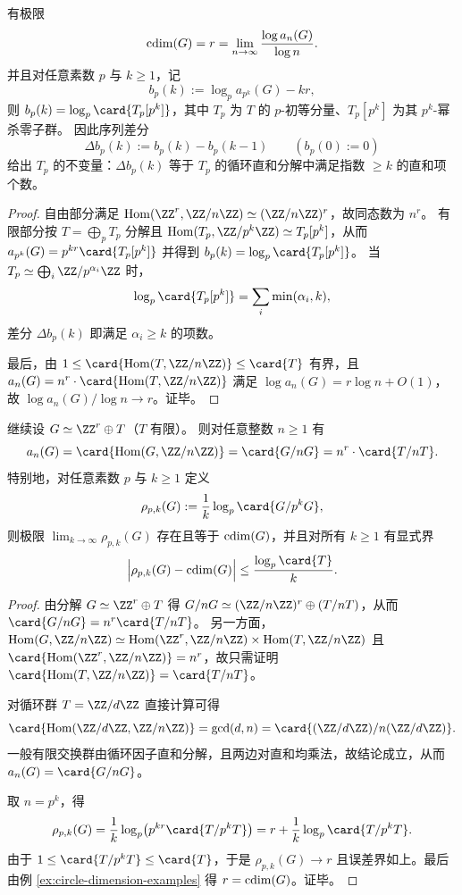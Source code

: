 \begin{theorem}\label{thm:cdim-finite-probe-extraction}
有极限
\[
\operatorname{cdim}(G)=r=\lim_{n\to\infty}\frac{\log a_n(G)}{\log n}.
\]
并且对任意素数 \(p\) 与 \(k\ge 1\)，记
\[
b_{p}(k):=\log_p a_{p^k}(G)-kr,
\]
则 \(b_p(k)=\log_p\card{T_p[p^k]}\)，其中 \(T_p\) 为 \(T\) 的 \(p\)-初等分量、\(T_p[p^k]\) 为其 \(p^k\)-幂杀零子群。
因此序列差分
\[
\Delta b_p(k):=b_p(k)-b_p(k-1)\qquad(b_p(0):=0)
\]
给出 \(T_p\) 的不变量：\(\Delta b_p(k)\) 等于 \(T_p\) 的循环直和分解中满足指数 \(\ge k\) 的直和项个数。
\end{theorem}
\begin{proof}
自由部分满足 \(\operatorname{Hom}(\ZZ^r,\ZZ/n\ZZ)\simeq(\ZZ/n\ZZ)^r\)，故同态数为 \(n^r\)。
有限部分按 \(T=\bigoplus_p T_p\) 分解且
\(
\operatorname{Hom}(T_p,\ZZ/p^k\ZZ)\simeq T_p[p^k]
\)，从而
\(
a_{p^k}(G)=p^{kr}\card{T_p[p^k]}
\)
并得到 \(b_p(k)=\log_p\card{T_p[p^k]}\)。
当 \(T_p\simeq\bigoplus_i \ZZ/p^{\alpha_i}\ZZ\) 时，
\[
\log_p\card{T_p[p^k]}=\sum_i \min(\alpha_i,k),
\]
差分 \(\Delta b_p(k)\) 即满足 \(\alpha_i\ge k\) 的项数。
\par
最后，由 \(1\le \card{\operatorname{Hom}(T,\ZZ/n\ZZ)}\le \card{T}\) 有界，且
\(
a_n(G)=n^r\cdot \card{\operatorname{Hom}(T,\ZZ/n\ZZ)}
\)
满足 \(\log a_n(G)=r\log n+O(1)\)，故 \(\log a_n(G)/\log n\to r\)。证毕。
\end{proof}

\begin{proposition}\label{prop:cdim-residual-quotient-probe}
继续设 \(G\simeq \ZZ^r\oplus T\)（\(T\) 有限）。
则对任意整数 \(n\ge 1\) 有
\[
a_n(G)=\card{\operatorname{Hom}(G,\ZZ/n\ZZ)}=\card{G/nG}
=n^r\cdot \card{T/nT}.
\]
特别地，对任意素数 \(p\) 与 \(k\ge 1\) 定义
\[
\rho_{p,k}(G):=\frac{1}{k}\log_p\card{G/p^kG},
\]
则极限 \(\lim_{k\to\infty}\rho_{p,k}(G)\) 存在且等于 \(\operatorname{cdim}(G)\)，并且对所有 \(k\ge 1\) 有显式界
\[
\Bigl|\rho_{p,k}(G)-\cdim(G)\Bigr|\le \frac{\log_p\card{T}}{k}.
\]
\end{proposition}
\begin{proof}
由分解 \(G\simeq \ZZ^r\oplus T\) 得
\(
G/nG\simeq (\ZZ/n\ZZ)^r\oplus (T/nT)
\)，从而 \(\card{G/nG}=n^r\card{T/nT}\)。
另一方面，
\(
\operatorname{Hom}(G,\ZZ/n\ZZ)\simeq \operatorname{Hom}(\ZZ^r,\ZZ/n\ZZ)\times \operatorname{Hom}(T,\ZZ/n\ZZ)
\)
且 \(\card{\operatorname{Hom}(\ZZ^r,\ZZ/n\ZZ)}=n^r\)，故只需证明
\(\card{\operatorname{Hom}(T,\ZZ/n\ZZ)}=\card{T/nT}\)。
\par
对循环群 \(T=\ZZ/d\ZZ\) 直接计算可得
\[
\card{\operatorname{Hom}(\ZZ/d\ZZ,\ZZ/n\ZZ)}=\gcd(d,n)
=\card{(\ZZ/d\ZZ)/n(\ZZ/d\ZZ)}.
\]
一般有限交换群由循环因子直和分解，且两边对直和均乘法，故结论成立，从而 \(a_n(G)=\card{G/nG}\)。
\par
取 \(n=p^k\)，得
\[
\rho_{p,k}(G)=\frac{1}{k}\log_p\bigl(p^{kr}\card{T/p^kT}\bigr)
=r+\frac{1}{k}\log_p\card{T/p^kT}.
\]
由于 \(1\le \card{T/p^kT}\le \card{T}\)，于是
\(
\rho_{p,k}(G)\to r
\)
且误差界如上。最后由例 \ref{ex:circle-dimension-examples} 得 \(r=\operatorname{cdim}(G)\)。证毕。
\end{proof}

